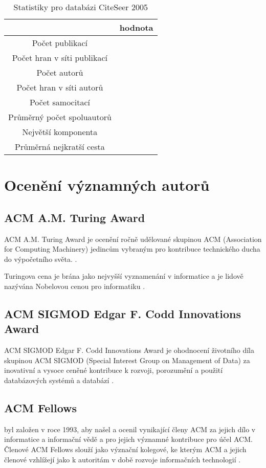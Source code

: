 \documentclass[12pt,titlepage]{report}
\begin{document}
\begin{table}[!ht]
\begin{center}
\begin{tabular}{cc}
\hline
& hodnota \\
\hline
Počet publikací & \\
Počet hran v síti publikací & \\
Počet autorů &  \\
Počet hran v síti autorů &  \\
Počet samocitací &  \\
Průměrný počet spoluautorů & \\
Největší komponenta & \\
Průměrná nejkratší cesta & \\
\hline
\end{tabular}
\caption{Statistiky pro databázi CiteSeer 2005}
\label{tab:dblpstat}
\end{center}
\end{table}



\section{Ocenění významných autorů}
\subsection{ACM A.M. Turing Award}
ACM A.M. Turing Award je ocenění ročně udělované skupinou ACM (Association for
Computing Machinery) jedincům vybraným pro kontribuce technického ducha do
výpočetního světa.
\cite{turingaward}.

Turingova cena je brána jako nejvyšší vyznamenání v informatice a je lidově
nazývána Nobelovou cenou pro informatiku \cite[p.~317]{dasgupta}.

\subsection{ACM SIGMOD Edgar F. Codd Innovations Award}
ACM SIGMOD Edgar F. Codd Innovations Award je ohodnocení životního díla
skupinou ACM SIGMOD (Special Interest Group on Management of Data)  za
inovativní a vysoce ceněné kontribuce k rozvoji, porozumění a použití
databázových systémů a databází \cite{sigmodinnovations}.

\subsection{ACM Fellows}
 byl založen v roce 1993, aby našel a ocenil
vynikající členy ACM za jejich dílo v informatice a informační vědě a pro
jejich významné kontribuce pro účel ACM. Členové ACM Fellows slouží jako
význační kolegové, ke kterým ACM a jejich členové vzhlížejí jako k autoritám v
době rozvoje informačních technologií \cite{acmfellows}.
\end{document}
